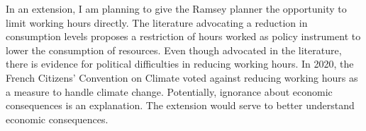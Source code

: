 


In an extension, I am planning to give the Ramsey planner the opportunity to limit working hours directly. The literature advocating a reduction in consumption levels \citep[e.g.,][]{Schor2005SustainableReduction} proposes a restriction of hours worked as policy instrument to lower the consumption of resources.
Even though advocated in the literature, there is evidence for political difficulties in reducing working hours. In 2020, the French Citizens' Convention on Climate voted against reducing working hours as a measure to handle climate change. Potentially, ignorance about economic consequences is an explanation. The extension would serve to better understand economic consequences. 



\begin{comment}
\paragraph{Extension: What if the low skilled get a higher share \ar they reduce even less \ar more fossil input supply}

Redistribution to households with a higher marginal propensity to consume emissions counteracts the externality. This effect is amplified by a market size effect  of dirty goods. 

content...
\end{comment}


